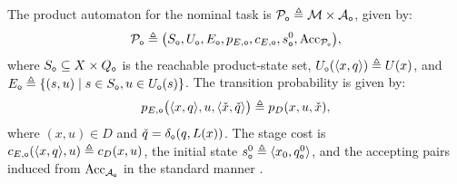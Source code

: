 \begin{definition}
\label{ch06:def:product-o}
The product automaton for the nominal task is
\(\mathcal{P}_{\textup{\texttt{o}}} \triangleq
\mathcal{M} \times \mathcal{A}_{\textup{\texttt{o}}}\), given by:
\begin{equation}
\label{ch06:eq:prod-o}
\mathcal{P}_{\textup{\texttt{o}}} \triangleq
\bigl(
S_{\textup{\texttt{o}}},
U_{\textup{\texttt{o}}},
E_{\textup{\texttt{o}}},
p_{E,\textup{\texttt{o}}},
c_{E,\textup{\texttt{o}}},
s^{0}_{\textup{\texttt{o}}},
\mathrm{Acc}_{\mathcal{P}_{\textup{\texttt{o}}}}
\bigr),
\end{equation}
where \(S_{\textup{\texttt{o}}} \subseteq
X \times Q_{\textup{\texttt{o}}}\) is the reachable product-state set,
\(U_{\textup{\texttt{o}}}(\langle x,q\rangle) \triangleq U(x)\), and
\(E_{\textup{\texttt{o}}} \triangleq
\{(s,u) \mid s \in S_{\textup{\texttt{o}}},
u \in U_{\textup{\texttt{o}}}(s)\}\).
The transition probability is given by:
\begin{equation}
\label{ch06:eq:new_pro}
p_{E,\textup{\texttt{o}}}
\bigl(
\langle x,q\rangle, u, \langle \check{x},\check{q}\rangle
\bigr)
\triangleq p_D(x,u,\check{x}),
\end{equation}
where \((x,u) \in D\) and
\(\check{q} = \delta_{\textup{\texttt{o}}}(q,L(x))\).
The stage cost is
\(c_{E,\textup{\texttt{o}}}(\langle x,q\rangle,u)
\triangleq c_D(x,u)\), the initial state
\(s^{0}_{\textup{\texttt{o}}} \triangleq
\langle x_0, q^{0}_{\textup{\texttt{o}}}\rangle\), and the accepting pairs
induced from
\(\mathrm{Acc}_{\mathcal{A}_{\textup{\texttt{o}}}}\) in the standard
manner \citep{baier2008principles}.
\end{definition}

